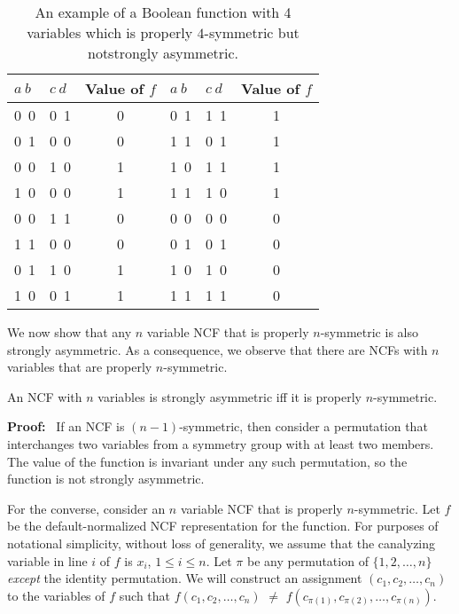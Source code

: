 
\begin{table}[tb]
\begin{center}
\begin{tabular}{|l|l|c||l|l|c|}\hline
$a~b$ & $c~d$ & {Value of $f$} & $a~b$ & $c~d$ & {Value of $f$} \\ \hline\hline
0~0 & 0~1 & 0 & 0~1 & 1~1 & 1 \\ \hline
0~1 & 0~0 & 0 & 1~1 & 0~1 & 1  \\ \hline
0~0 & 1~0 & 1 & 1~0 & 1~1 & 1 \\ \hline
1~0 & 0~0 & 1 & 1~1 & 1~0 & 1 \\ \hline
0~0 & 1~1 & 0 & 0~0 & 0~0 & 0 \\ \hline
1~1 & 0~0 & 0 & 0~1 & 0~1 & 0 \\ \hline
0~1 & 1~0 & 1 & 1~0 & 1~0 & 0 \\ \hline
1~0 & 0~1 & 1 & 1~1 & 1~1 & 0 \\ \hline
\end{tabular}
\end{center}
\caption{An example of a Boolean function with 4 variables which is
properly $4$-symmetric but not\newline strongly asymmetric.}
\label{tab:not_str_ssym_ex}
\end{table}


We now show that any $n$ variable NCF that is properly $n$-symmetric
is also strongly asymmetric.
As a consequence, we observe that there are NCFs with $n$ variables
that are properly $n$-symmetric.

\begin{theorem}\label{thm:ncf_strong_asymmetry}
An NCF with $n$ variables is strongly asymmetric iff
it is properly $n$-symmetric.
\end{theorem}

\noindent
\textbf{Proof:}~ 
If an NCF is $(n-1)$-symmetric, then consider a permutation that
interchanges two variables from a symmetry group with at least two
members.  The value of the function is invariant under any such
permutation, so the function is not strongly asymmetric.

For the converse, consider an $n$ variable NCF that is properly $n$-symmetric.
Let $f$ be the default-normalized NCF representation for the function.  For
purposes of notational simplicity, without loss of generality,
we assume that the canalyzing
variable in line $i$ of $f$ is $x_i$, $1 \leq i \leq n$.  Let $\pi$
be any permutation of $\{1, 2, \ldots, n\}$ \emph{except} the
identity permutation.  We will construct an assignment $(c_1, c_2,
\ldots,  c_n)$ to the variables of $f$ such that $f(c_1, c_2, \ldots,
c_n)$ $\neq$ $f(c_{\pi(1)}, c_{\pi(2)}, \ldots, c_{\pi(n)})$.

